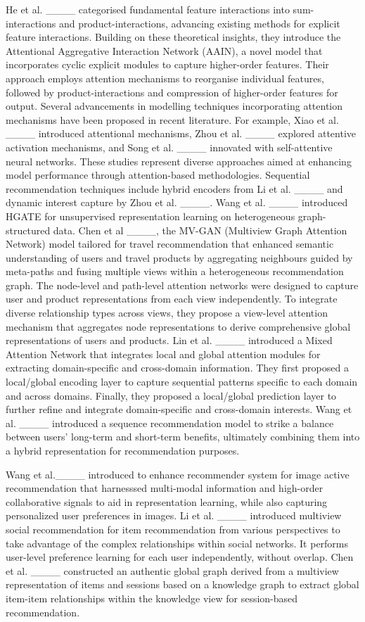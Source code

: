     He et al. ____ categorised fundamental feature interactions into sum-interactions and product-interactions, advancing existing methods for explicit feature interactions. Building on these theoretical insights, they introduce the Attentional Aggregative Interaction Network (AAIN), a novel model that incorporates cyclic explicit modules to capture higher-order features. Their approach employs attention mechanisms to reorganise individual features, followed by product-interactions and compression of higher-order features for output. Several advancements in modelling techniques incorporating attention mechanisms have been proposed in recent literature. For example, Xiao et al. ____ introduced attentional mechanisms, Zhou et al. ____ explored attentive activation mechanisms, and Song et al. ____ innovated with self-attentive neural networks. These studies represent diverse approaches aimed at enhancing model performance through attention-based methodologies. Sequential recommendation techniques include hybrid encoders from Li et al. ____ and dynamic interest capture by Zhou et al. ____. Wang et al. ____ introduced HGATE for unsupervised representation learning on heterogeneous graph-structured data. Chen et al ____,  the MV-GAN (Multiview Graph Attention Network) model tailored for travel recommendation that enhanced semantic understanding of users and travel products by aggregating neighbours guided by meta-paths and fusing multiple views within a heterogeneous recommendation graph. The node-level and path-level attention networks were  designed to capture user and product representations from each view independently. To integrate diverse relationship types across views, they propose a view-level attention mechanism that aggregates node representations to derive comprehensive global representations of users and products. Lin et al. ____ introduced a Mixed Attention Network that integrates local and global attention modules for extracting domain-specific and cross-domain information. They first proposed a local/global encoding layer to capture sequential patterns specific to each domain and across domains. Finally, they proposed a local/global prediction layer to further refine and integrate domain-specific and cross-domain interests. Wang et al. ____ introduced a sequence recommendation model to strike a balance between users' long-term and short-term benefits, ultimately combining them into a hybrid representation for recommendation purposes.
    
    Wang et al.____ introduced to enhance recommender system for  image active recommendation that harnesssed multi-modal information and high-order collaborative signals to aid in representation learning, while also capturing personalized user preferences in images.  Li et al.  ____ introduced  multiview social recommendation for item recommendation from various perspectives  to take advantage of the complex relationships within social networks. It performs user-level preference learning for each user independently, without overlap. Chen et al. ____ constructed an authentic global graph derived from a multiview representation of items and sessions based on a knowledge graph to extract global item-item relationships within the knowledge view for session-based recommendation.
    
